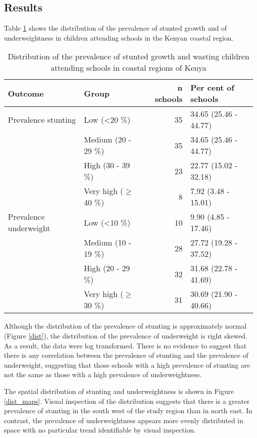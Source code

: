 \documentclass[11pt,a4paper,twoside]{article}\usepackage[]{graphicx}\usepackage[]{color}
\begin{document}
\subsection{Results}
Table \ref{tab1} shows the distribution of the prevalence of stunted growth and of underweightness in children attending schools in the Kenyan coastal region.
\begin{table}[ht]
\centering
\begin{tabular}{llrl}
  \toprule
Outcome & Group & n schools & Per cent of schools \\ 
  \midrule
Prevalence stunting & Low (\textless 20 \%) & 35 & 34.65 (25.46 - 44.77) \\ 
   & Medium (20 - 29 \%) & 35 & 34.65 (25.46 - 44.77) \\ 
   & High (30 - 39 \%) & 23 & 22.77 (15.02 - 32.18) \\ 
   & Very high ($\ge$ 40 \%) & 8 & 7.92 (3.48 - 15.01) \\ 
  Prevalence underweight & Low (\textless 10 \%) & 10 & 9.90 (4.85 - 17.46) \\ 
   & Medium (10 - 19 \%) & 28 & 27.72 (19.28 - 37.52) \\ 
   & High (20 - 29 \%) & 32 & 31.68 (22.78 - 41.69) \\ 
   & Very high ($\ge$ 30 \%) & 31 & 30.69 (21.90 - 40.66) \\ 
   \bottomrule
\end{tabular}
\caption{Distribution of the prevalence of stunted growth and wasting children attending schools in coastal regions of Kenya} 
\label{tab1}
\end{table}


Although the distribution of the prevalence of stunting is approximately normal (Figure \ref{dist}), the distribution of the prevalence of underweight is right skewed. 
As a result, the data were log transformed. 
There is no evidence to suggest that there is any correlation between the prevalence of stunting and the prevalence of underweight, suggesting that those schools with a high prevalence of stunting are not the same as those with a high prevalence of underweightness. 

The spatial distribution of stunting and underweightness is shown in Figure \ref{dist_maps}. 
Visual inspection of the distribution suggests that there is a greater prevalence of stunting in the south west of the study region than in north east. 
In contrast, the prevalence of underweightness appears more evenly distributed in space with no particular trend identifiable by visual inspection. 
\end{document}
